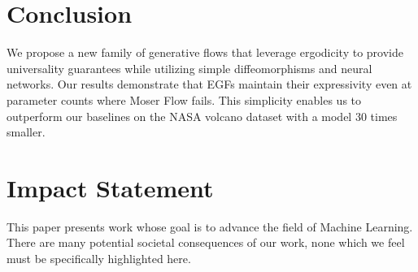 \documentclass{article}
\theoremstyle{plain}
\theoremstyle{definition}
\theoremstyle{remark}
\theoremstyle{fact}
\begin{document}


\section{Conclusion}
% 
We propose a new family of generative flows that leverage ergodicity to provide universality guarantees while utilizing simple diffeomorphisms and neural networks. Our results demonstrate that EGFs maintain their expressivity even at parameter counts where Moser Flow \cite{rozen2021moser} fails. This simplicity enables us to outperform our baselines on the NASA volcano dataset with a model 30 times smaller.

\section*{Impact Statement}
This paper presents work whose goal is to advance the field of Machine Learning. There are many potential societal consequences of our work, none which we feel must be specifically highlighted here.




\newpage
\appendix
\onecolumn
\end{document}
